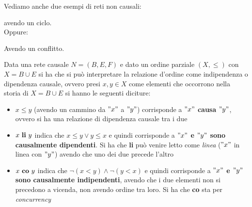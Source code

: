 \begin{esempio}
  Vediamo anche due esempi di reti non causali:
  \begin{figure}[H]
    \centering
  \end{figure}
  avendo un ciclo.\\
  Oppure:
  \begin{figure}[H]
    \centering
  \end{figure}
  Avendo un conflitto.
\end{esempio}
\begin{definizione}
  Data una rete causale $N=(B, E, F)$ e dato un ordine parziale $(X, \leq)$ con
  $X=B\cup E$ si ha che si può interpretare la relazione d'ordine come
  indipendenza o dipendenza causale, ovvero presi $x, y\in X$ come elementi che
  occorrono nella storia di $X=B\cup E$ si hanno le seguenti diciture:
  \begin{itemize}
    \item $x\leq y$ (avendo un cammino da $"x"$ a $"y"$) corrisponde a \textbf{$"x"$
      causa $"y"$}, ovvero si ha una relazione di dipendenza causale tra i due
    \item $x \mbox{ \textbf{li} }y$ indica che $x\leq y\lor y\leq x$ e quindi
    corrisponde a \textbf{$"x"$ e $"y"$ sono causalmente dipendenti}. Si ha che
    \textbf{li} può venire letto come \textit{linea} ($"x"$ in linea con $"y"$) 
    avendo che uno dei due precede l'altro
    \item $x \mbox{ \textbf{co} }y$ indica che $\neg(x< y)\land \neg(y < x)$ e
    quindi corrisponde a \textbf{$"x"$ e $"y"$ sono causalmente indipendenti},
    avendo che i due elementi non si precedono a vicenda, non avendo ordine tra
    loro. Si ha che \textbf{co} sta per \textit{concurrency}
  \end{itemize}
\end{definizione} \vspace{5mm} %
